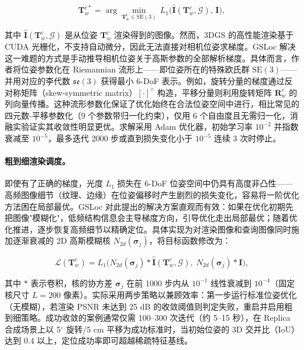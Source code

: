 \begin{equation}
    \mathbf{T}_w^{c*} = \arg\min_{\mathbf{T}_w^c \in \mathrm{SE}(3)} \, L_1 \bigl( \hat{\mathbf{I}}(\mathbf{T}_w^c, \mathcal{G}), \, \mathbf{I} \bigr),
\end{equation}

其中 $\hat{\mathbf{I}}(\mathbf{T}_w^c, \mathcal{G})$ 是从位姿 $\mathbf{T}_w^c$ 渲染得到的图像。然而，3DGS 的高性能渲染基于 CUDA 光栅化，不支持自动微分，因此无法直接对相机位姿求梯度。GSLoc 解决这一难题的方式是手动推导相机位姿关于高斯参数的全部解析梯度。具体而言，作者将位姿参数化在 Riemannian 流形上——即位姿所在的特殊欧氏群 $\mathrm{SE}(3)$——并用对应的李代数 $\mathfrak{se}(3)$ 获得最小 6-DoF 表示。例如，旋转分量的梯度通过反对称矩阵（skew-symmetric matrix）$[\cdot]^\wedge$ 构造，平移分量则利用旋转矩阵 $\mathbf{R}_w^c$ 的列向量传播。这种流形参数化保证了优化始终在合法位姿空间中进行，相比常见的四元数-平移参数化（9 个参数带归一化约束），仅用 6 个自由度且无需归一化，消融实验证实其收敛性明显更优。求解采用 Adam 优化器，初始学习率 $10^{-2}$ 并指数衰减至 $10^{-5}$，最多迭代 2000 步或直到损失变化小于 $10^{-5}$ 连续 3 次时停止。

\paragraph{粗到细渲染调度。}
即使有了正确的梯度，光度 $L_1$ 损失在 6-DoF 位姿空间中仍具有高度非凸性——高频图像细节（纹理、边缘）在位姿偏移时产生剧烈的损失变化，容易将一阶优化方法困在局部最优。GSLoc 对此提出的解决方案直观而有效：如果在优化初期先把图像"模糊化"，低频结构信息会主导梯度方向，引导优化走出局部最优；随着优化推进，逐步恢复高频细节以精确定位。具体实现为对渲染图像和查询图像同时施加逐渐衰减的 2D 高斯模糊核 $N_{2d}(\boldsymbol{\sigma}_j)$，将目标函数修改为：

\begin{equation}
    \mathcal{L}(\mathbf{T}_w^c) = L_1 \bigl( N_{2d}(\boldsymbol{\sigma}_j) * \hat{\mathbf{I}}(\mathbf{T}_w^c, \mathcal{G}), \; N_{2d}(\boldsymbol{\sigma}_j) * \mathbf{I} \bigr),
\end{equation}

其中 $*$ 表示卷积，核的协方差 $\boldsymbol{\sigma}_j$ 在前 1000 步内从 $10^{-1}$ 线性衰减到 $10^{-4}$（固定核尺寸 $L=200$ 像素）。实际采用两步策略以兼顾效率：第一步运行标准位姿优化（无模糊），若渲染 PSNR 未达到 25 dB 的收敛阈值则判定失败，重启并启用粗到细策略。成功收敛的案例通常仅需 100--300 次迭代（约 5--15 秒），在 Replica 合成场景上以 5$^\circ$ 旋转/5 cm 平移为成功标准时，当初始位姿的 3D 交并比（IoU）达到 0.4 以上，定位成功率即可超越稀疏特征基线。

